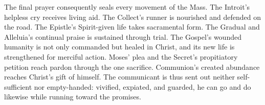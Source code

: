 The final prayer consequently seals every movement of the Mass. The Introit's
helpless cry receives living aid. The Collect's runner is nourished and
defended on the road. The Epistle's Spirit-given life takes sacramental form.
The Gradual and Alleluia's continual praise is sustained through trial. The
Gospel's wounded humanity is not only commanded but healed in Christ, and its
new life is strengthened for merciful action. Moses' plea and the Secret's
propitiatory petition reach pardon through the one sacrifice. Communion's
created abundance reaches Christ's gift of himself. The communicant is thus
sent out neither self-sufficient nor empty-handed: vivified, expiated, and
guarded, he can go and do likewise while running toward the promises.
